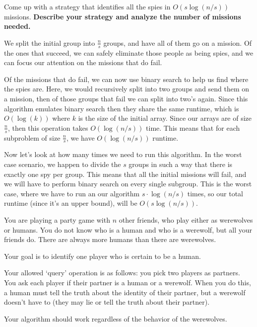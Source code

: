 \documentclass[11pt]{article}
\begin{document}
Come up with a strategy that identifies all the spies in $O(s \log (n/s))$ missions. \textbf{Describe your strategy and analyze the number of missions needed.}

\begin{solution}
	We split the initial group into $\frac{n}{s}$ groups, and have all of them go on a mission. Of the ones 
	that succeed, we can safely eliminate those people as being spies, and we can focus our attention on the 
	missions that do fail. 

	Of the missions that do fail, we can now use binary search to help us find where the spies are. 
	Here, we would recursively split into two groups and send them on a mission, then of those groups
	that fail we can split into two's again. Since this algorithm emulates binary search then they share the same
	runtime, which is $O(\log(k))$ where $k$ is the size of the initial array. Since our arrays are of 
	size $\frac{n}{s}$, then this operation takes $O(\log(n / s))$ time. This means that for 
	each subproblem of size $\frac{n}{s}$, we have $O(\log (n / s))$ runtime. 

	Now let's look at how many times we need to run this algorithm. In the worst case scenario, we happen to 
	divide the $s$ groups in such a way that there is exactly one spy per group. This means that all the 
	initial missions will fail, and we will have to perform binary search on every single subgroup. This 
	is the worst case, where we have to run an our algorithm $s \cdot \log(n / s)$ times, so our total 
	runtime (since it's an upper bound), will be $O(s \log (n / s))$. 
\end{solution}
\pagebreak
{}
You are playing a party game with $n$ other friends, who play either as werewolves or humans.
You do not know who is a human and who is a werewolf, but all your friends do.
There are always more humans than there are werewolves.

Your goal is to identify one player who is certain to be a human.

Your allowed `query' operation is as follows: you pick two players as partners. You ask each player if their partner is a human or a werewolf.
When you do this, a human must tell the truth about the identity of their partner,
but a werewolf doesn't have to (they may lie or tell the truth about their partner).

Your algorithm should work regardless of the behavior of the werewolves.
\end{document}
